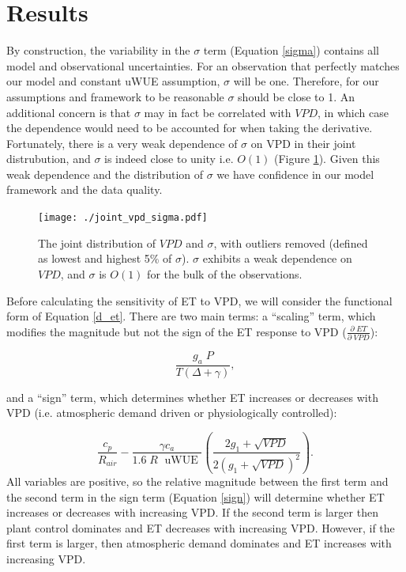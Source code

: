 \documentclass[draft,linenumbers]{agujournal}
\begin{document}
\section{Results}
\label{results}

By construction, the variability in the $\sigma$ term (Equation
\ref{sigma}) contains all model and observational uncertainties. For
an observation that perfectly matches our model and constant uWUE
assumption, $\sigma$ will be one. Therefore, for our assumptions and
framework to be reasonable $\sigma$ should be close to 1. An
additional concern is that $\sigma$ may in fact be correlated with
$VPD$, in which case the dependence would need to be accounted for
when taking the derivative. Fortunately, there is a very weak
dependence of $\sigma$ on VPD in their joint distrubution, and
$\sigma$ is indeed close to unity i.e. $O(1)$ (Figure
\ref{joint_vpd_sigma}). Given this weak dependence and the
distribution of $\sigma$ we have confidence in our model framework and
the data quality.

\begin{figure}
  \centering \texttt{[image: ./joint\_vpd\_sigma.pdf]}
  \caption{The joint distribution of $VPD$ and $\sigma$, with outliers
    removed (defined as lowest and highest 5\% of $\sigma$). $\sigma$
    exhibits a weak dependence on $VPD$, and $\sigma$ is $O(1)$ for
    the bulk of the observations.}
  \label{joint_vpd_sigma}
\end{figure}

Before calculating the sensitivity of ET to VPD, we will consider the
functional form of Equation \ref{d_et}. There are two main terms: a
``scaling'' term, which modifies the magnitude but not the sign of the
ET response to VPD ($\frac{\partial \; ET}{\partial \; VPD}$):

\begin{equation}
  \frac{g_a \; P}{T(\Delta + \gamma)},
\end{equation}

and a ``sign'' term, which determines whether ET increases or
decreases with VPD (i.e. atmospheric demand driven or physiologically
controlled):

\begin{equation}
  \label{sign}
  \frac{c_p}{R_{air}} - \frac{\gamma c_a }{1.6 \; R\; \text{ uWUE }} \left( \frac{2 g_1 + \sqrt{VPD}}{2 (g_1 + \sqrt{VPD})^2}\right).
\end{equation}
All variables are positive, so the relative magnitude between the
first term and the second term in the sign term (Equation \ref{sign})
will determine whether ET increases or decreases with increasing
VPD. If the second term is larger then plant control dominates and ET
decreases with increasing VPD. However, if the first term is larger,
then atmospheric demand dominates and ET increases with increasing
VPD.
\end{document}
